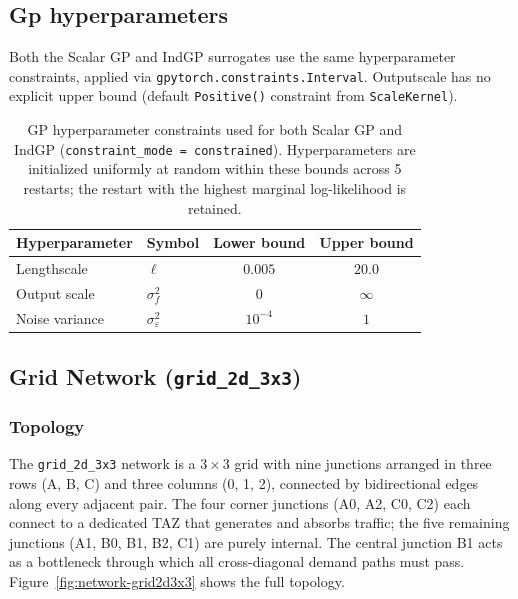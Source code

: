 \documentclass[11pt]{article}
\begin{document}
\subsection{Gp hyperparameters}

Both the Scalar GP and IndGP surrogates use the same hyperparameter
constraints, applied via \texttt{gpytorch.constraints.Interval}.
Outputscale has no explicit upper bound (default \texttt{Positive()}
constraint from \texttt{ScaleKernel}).

\begin{table}[h]
\centering
\begin{tabular}{llcc}
\toprule
Hyperparameter & Symbol & Lower bound & Upper bound \\
\midrule
Lengthscale    & $\ell$                    & $0.005$ & $20.0$ \\
Output scale   & $\sigma^2_f$              & $0$     & $\infty$ \\
Noise variance & $\sigma^2_{\varepsilon}$  & $10^{-4}$ & $1$ \\
\bottomrule
\end{tabular}
\caption{GP hyperparameter constraints used for both Scalar GP and IndGP
         (\texttt{constraint\_mode = constrained}).
         Hyperparameters are initialized uniformly at random within these
         bounds across 5 restarts; the restart with the highest marginal
         log-likelihood is retained.}
\label{tab:gp_constraints}
\end{table}



\subsection{Grid Network (\texttt{grid\_2d\_3x3})}
\label{app:network_grid2d3x3}

\subsubsection*{Topology}

The \texttt{grid\_2d\_3x3} network is a $3\times 3$  grid with nine
junctions arranged in three rows (A, B, C) and three columns (0, 1, 2),
connected by bidirectional edges along every adjacent pair. The four corner
junctions (A0, A2, C0, C2) each connect to a dedicated TAZ that generates
and absorbs traffic; the five remaining junctions (A1, B0, B1, B2, C1) are
purely internal. The central junction B1 acts as a bottleneck through which
all cross-diagonal demand paths must pass.
Figure~\ref{fig:network-grid2d3x3} shows the full topology.
\end{document}

